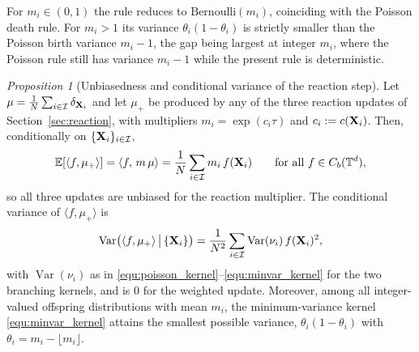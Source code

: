 \documentclass[a4paper,fleqn]{cas-sc}
\theoremstyle{definition}
\theoremstyle{remark}
\newtheorem{proposition}[theorem]{Proposition}
\begin{document}
For $m_i\in(0,1)$ the rule reduces to $\mathrm{Bernoulli}(m_i)$, coinciding with the Poisson death rule. For
$m_i>1$ its variance $\theta_i(1-\theta_i)$ is strictly smaller than the Poisson birth variance $m_i-1$, the gap
being largest at integer $m_i$, where the Poisson rule still has variance $m_i-1$ while the present rule is
deterministic.
\begin{proposition}[Unbiasedness and conditional variance of the reaction step]
\label{prop:stochastic_branch}
Let $\mu=\frac1N\sum_{i\in\mathcal I}\delta_{\mathbf{X}_i}$ and let $\mu_+$ be produced by any of the three reaction
updates of Section~\ref{sec:reaction}, with multipliers $m_i=\exp(c_i\tau)$ and $c_i:=c(\mathbf{X}_i)$. Then,
conditionally on $\{\mathbf{X}_i\}_{i\in\mathcal I}$,
\[
\mathbb E[\langle f,\mu_+\rangle]=\langle f,\, m\,\mu\rangle
=\frac1N\sum_{i\in\mathcal I} m_i\,f(\mathbf{X}_i)
\qquad\text{for all } f\in C_b(\mathbb T^d),
\]
so all three updates are unbiased for the reaction multiplier. The conditional variance of $\langle f,\mu_+\rangle$
is
\[
\operatorname{Var}\!\big(\langle f,\mu_+\rangle \,\big|\, \{\mathbf{X}_i\}\big)
=\frac1{N^2}\sum_{i\in\mathcal I}\operatorname{Var}(\nu_i)\,f(\mathbf{X}_i)^2,
\]
with $\operatorname{Var}(\nu_i)$ as in \eqref{equ:poisson_kernel}--\eqref{equ:minvar_kernel} for the two
branching kernels, and is $0$ for the weighted update. Moreover, among all integer-valued offspring distributions
with mean $m_i$, the minimum-variance kernel \eqref{equ:minvar_kernel} attains the smallest possible variance,
$\theta_i(1-\theta_i)$ with $\theta_i=m_i-\lfloor m_i\rfloor$.
\end{proposition}
\end{document}
